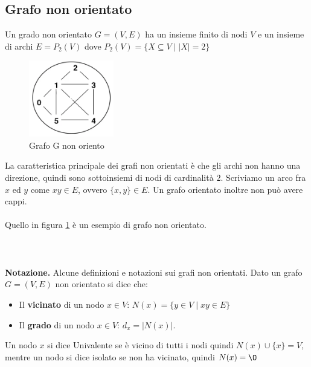 \subsection{Grafo non orientato}
\begin{definition}
    Un grado non orientato $G = (V,E)$ ha un insieme finito di nodi $V$ e un insieme di archi $E = P_2(V)$ dove $P_2(V) = \{X \subseteq V \mid |X| = 2\}$
\end{definition}
\begin{figure}
    \vspace{-15pt}
    \centering
    \includegraphics[width=3.7cm]{images/esempio-grafo-non-orientato.png}
    \vspace{-5pt}
    \caption{Grafo G non oriento}
    \label{fig:esempio-grafo-non-orientato}
\end{figure}
La caratteristica principale dei grafi non orientati è che gli archi non hanno una direzione, quindi sono sottoinsiemi di nodi di cardinalità $2$. Scriviamo un arco fra $x$ ed $y$ come $xy \in E$, ovvero $\{x,y\} \in E$. Un grafo orientato inoltre non può avere cappi.\\ \\
Quello in figura \ref{fig:esempio-grafo-non-orientato} è un esempio di grafo non orientato. \\\\\\\\
\textbf{Notazione.} Alcune definizioni e notazioni sui grafi non orientati. Dato un grafo $G = (V,E)$ non orientato si dice che:
\begin{itemize}
    \item Il \textbf{vicinato} di un nodo $x \in V$: \hspace{.7cm} $N(x) = \{y \in V \mid xy \in E\}$
    \item Il \textbf{grado} di un nodo $x \in V$: \hspace{.7cm} $d_x = \lvert N(x)\rvert$.
\end{itemize}
\begin{definition}
    Un nodo $x$ si dice Univalente se è vicino di tutti i nodi quindi $N(x) \cup \{x\} = V$, mentre un nodo si dice isolato se non ha vicinato, quindi $N(x) = \O$
\end{definition}

